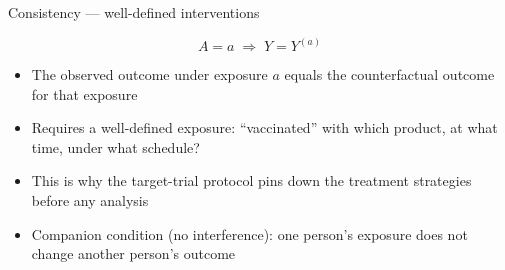 \documentclass[aspectratio=169,10pt]{beamer}
\begin{document}
\begin{frame}[t]{Consistency --- well-defined interventions}
  \vspace*{0.35cm}

  \[
    A = a \;\Rightarrow\; Y = Y^{(a)}
  \]

  \vspace{0.3em}
  \begin{itemize}
    \item The observed outcome under exposure \(a\) equals the
      counterfactual outcome for that exposure
    \item Requires a well-defined exposure: ``vaccinated'' with which
      product, at what time, under what schedule?
    \item This is why the target-trial protocol pins down the treatment
      strategies before any analysis
    \item Companion condition (no interference): one person's exposure
      does not change another person's outcome
  \end{itemize}

  \vspace{0.2em}
  \begin{center}
  \end{center}
\end{frame}
\end{document}

